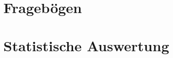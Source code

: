 \appendix
{}\label{chap.Anhang}
\setcounter{section}{0}
\section{Fragebögen}


\section{Statistische Auswertung}
